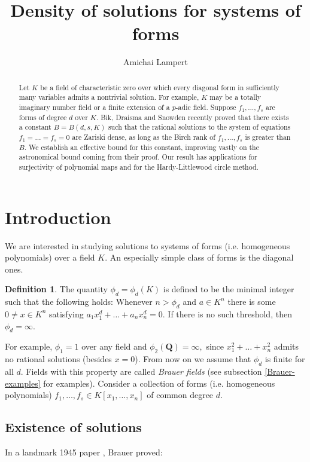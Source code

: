 \documentclass[12pt]{amsart}
\author{Amichai Lampert}
\title{Density of solutions for systems of forms}
\date{}
\theoremstyle{definition}
\newtheorem{definition}[theorem]{Definition}
\newcommand{\Q}{\mathbf{Q}}
\begin{document}
\begin{abstract}
    Let $K$ be a field of characteristic zero over which every diagonal form in sufficiently many variables admits a nontrivial solution. For example, $K$ may be a totally imaginary number field or a finite extension of a $p$-adic field. Suppose $f_1,\ldots,f_s$ are forms of degree $d$ over $K.$ Bik, Draisma and Snowden recently proved that there exists a constant $B = B(d,s,K)$ such that the rational solutions to the system of equations $f_1=\ldots=f_s = 0$ are Zariski dense, as long as the Birch rank of $f_1,\ldots,f_s$ is greater than $B.$ We establish an effective bound for this constant, improving vastly on the astronomical bound coming from their proof. Our result has applications for surjectivity of polynomial maps and for the Hardy-Littlewood circle method.
\end{abstract}

\maketitle

\section{Introduction}

We are interested in studying solutions to systems of forms (i.e. homogeneous polynomials) over a field $K.$ An especially simple class of forms is the diagonal ones. 

\begin{definition}
    The quantity  $\phi_d = \phi_d(K)$ is defined to be the minimal integer such that the following holds: Whenever $n > \phi_d$ and $a\in K^n$ there is some $0\neq x\in K^n$ satisfying $a_1x_1^d+\ldots+a_nx_n^d = 0.$ If there is no such threshold, then $\phi_d = \infty.$ 
\end{definition}

For example, $\phi_1 =1$ over any field and $\phi_2(\Q) = \infty,$ since $x_1^2+\ldots+x_n^2$ admits no rational solutions (besides $x = 0$). From now on we assume that $\phi_d$ is finite for all $d.$ Fields with this property are called \emph{Brauer fields} (see subsection \ref{Brauer-examples} for examples). Consider a collection of forms (i.e. homogeneous polynomials) $ f_1,\ldots,f_s \in K[x_1,\ldots,x_n]$ of common degree $d.$ 

\subsection{Existence of solutions} In a landmark 1945 paper \cite{Brauer}, Brauer proved:
\end{document}
